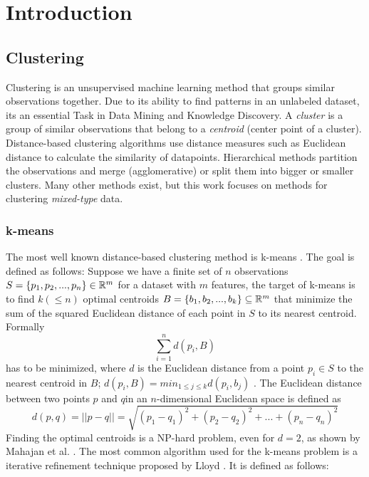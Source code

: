 \chapter{Introduction}


\section{Clustering}

Clustering is an unsupervised machine learning method that groups similar observations together. Due to its ability to find patterns in an unlabeled dataset, its an essential Task in Data Mining and Knowledge Discovery. A \textit{cluster} is a group of similar observations that belong to a \textit{centroid} (center point of a cluster). Distance-based clustering algorithms use distance measures such as Euclidean distance to calculate the similarity of datapoints. Hierarchical methods partition the observations and merge (agglomerative) or split them into bigger or smaller clusters. Many other methods exist, but this work focuses on methods for clustering \textit{mixed-type} data. \cite{mixed_type_survey_2019}

\subsection{k-means}

The most well known distance-based clustering method is k-means \cite{kmeans}. The goal is defined as follows: Suppose we have a finite set of $n$ observations $S=\{p_1, p_2, ..., p_n\} \in \mathbb{R}^m$ for a dataset with $m$ features, the target of k-means is to find $k (\leq n)$ optimal centroids $B=\{b_1, b_2, ..., b_k\} \subseteq \mathbb{R}^m$ that minimize the sum of the squared Euclidean distance of each point in $S$ to its nearest centroid. Formally
$$\sum_{i=1}^n  d(p_i, B)$$
has to be minimized, where $d$ is the Euclidean distance from a point $p_i \in S$ to the nearest centroid in $B$; $d(p_i, B) = min_{1 \leq j \leq k} d(p_i, b_j)$ \cite{kmeans_np_hard}. The Euclidean distance between two points $p$ and $q$in an $n$-dimensional Euclidean space is defined as 
$$d(p, q) = || p - q || = \sqrt{(p_1 - q_1)^2 + (p_2 - q_2)^2 + ... + (p_n - q_n)^2}$$
Finding the optimal centroids is a NP-hard problem, even for $d=2$, as shown by Mahajan et al. \cite{kmeans_np_hard}. The most common algorithm used for the k-means problem is a iterative refinement technique proposed by Lloyd \cite{kmeans_lloyd}. It is defined as follows:

